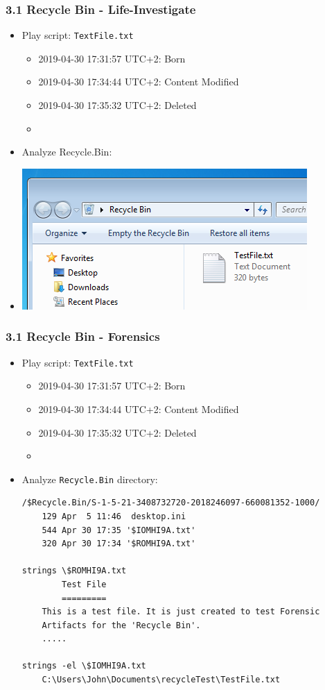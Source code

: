 \begin{frame}[fragile]
  \frametitle{3.1 Recycle Bin - Life-Investigate}
    \begin{itemize}
        \item Play script: \texttt{TextFile.txt} 
            \begin{itemize}
		\item 2019-04-30 17:31:57 UTC+2:  Born
		\item 2019-04-30 17:34:44 UTC+2:  Content Modified
		\item 2019-04-30 17:35:32 UTC+2:  Deleted
		\item[]
            \end{itemize}
        \item Analyze Recycle.Bin:
        \item[] \includegraphics[scale=.45]{images/f15_recycle.png}
    \end{itemize}
\end{frame}


\begin{frame}[fragile]
  \frametitle{3.1 Recycle Bin - Forensics}
    \begin{itemize}
        \item Play script: \texttt{TextFile.txt} 
            \begin{itemize}
		\item 2019-04-30 17:31:57 UTC+2:  Born
		\item 2019-04-30 17:34:44 UTC+2:  Content Modified
		\item 2019-04-30 17:35:32 UTC+2:  Deleted
		\item[]
            \end{itemize}
        \item Analyze \texttt{Recycle.Bin} directory:
  \begin{lstlisting}[basicstyle=\tiny]
/$Recycle.Bin/S-1-5-21-3408732720-2018246097-660081352-1000/
	129 Apr  5 11:46  desktop.ini
	544 Apr 30 17:35 '$IOMHI9A.txt'
	320 Apr 30 17:34 '$ROMHI9A.txt'

strings \$ROMHI9A.txt 
		Test File
		=========
	This is a test file. It is just created to test Forensic
	Artifacts for the 'Recycle Bin'.
	.....

strings -el \$IOMHI9A.txt 
	C:\Users\John\Documents\recycleTest\TestFile.txt
  \end{lstlisting}
    \end{itemize}
\end{frame}


